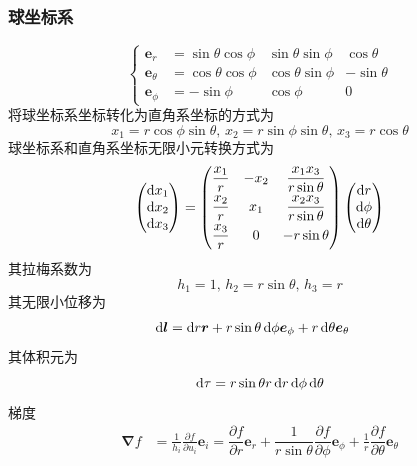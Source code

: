 \subsubsection{球坐标系}
\begin{equation}\left\{
    \begin{aligned}
        \boldsymbol{e}_r&=\sin\theta\cos\phi&\sin\theta\sin\phi&\cos\theta\\
        \boldsymbol{e}_\theta&=\cos\theta\cos\phi&\cos\theta\sin\phi&-\sin\theta\\
        \boldsymbol{e}_\phi&=-\sin\phi&\cos\phi&0
    \end{aligned}\right.
\end{equation}
将球坐标系坐标转化为直角系坐标的方式为
\begin{equation}
    x_1=r\cos\phi\sin\theta,\, x_2=r\sin\phi\sin\theta,\, x_3=r\cos\theta
\end{equation}
球坐标系和直角系坐标无限小元转换方式为
\begin{equation}
    \begin{pmatrix}
        \dif{x}_1\\\dif{x}_2\\\dif{x}_3
    \end{pmatrix}=\begin{pmatrix}
        \dfrac{x_1}{r}&-x_2&\dfrac{x_1x_3}{r\sin\theta}\\[6pt]
        \dfrac{x_2}{r}&x_1&\dfrac{x_2x_3}{r\sin\theta}\\[6pt]
        \dfrac{x_3}{r}&0&-r\sin\theta
    \end{pmatrix}\begin{pmatrix}
        \dif{r}\\\dif{\phi}\\\dif{\theta}
    \end{pmatrix}
\end{equation}
其拉梅系数为
\begin{equation}
    h_1=1,\, h_2=r\sin\theta,\, h_3=r
\end{equation}
其无限小位移为
\begin{align}
    \dif\boldsymbol{l}&=\dif{r}\boldsymbol{r}+r\sin\theta\dif{\phi}\boldsymbol{e}_\phi+r\dif{\theta}\boldsymbol{e}_\theta
\end{align}
其体积元为
\begin{equation}
    \dif\tau=r\sin\theta r\dif r\dif \phi\dif{\theta}
\end{equation}
梯度
\begin{align}
    \boldsymbol\nabla f&=\frac{1}{h_i}\frac{\partial f}{\partial u_i}{\boldsymbol e}_i
    =\dfrac{\partial f}{\partial r}\boldsymbol{e}_r+\dfrac{1}{r\sin\theta}\dfrac{\partial f}{\partial \phi}\boldsymbol{e}_\phi+\frac{1}{r}\dfrac{\partial f}{\partial \theta}\boldsymbol{e}_\theta
\end{align}
